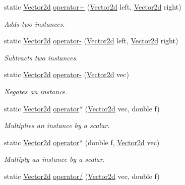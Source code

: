 \begin{DoxyCompactItemize}
static \hyperlink{struct_open_t_k_1_1_vector2d}{Vector2d} \hyperlink{struct_open_t_k_1_1_vector2d_a251b196f64b1ea5ad9b68f3995100faf}{operator+} (\hyperlink{struct_open_t_k_1_1_vector2d}{Vector2d} left, \hyperlink{struct_open_t_k_1_1_vector2d}{Vector2d} right)
\begin{DoxyCompactList}\small\item\em Adds two instances. \end{DoxyCompactList}\item 
static \hyperlink{struct_open_t_k_1_1_vector2d}{Vector2d} \hyperlink{struct_open_t_k_1_1_vector2d_ad046f955a83215dafa09a8ad34f345d0}{operator-\/} (\hyperlink{struct_open_t_k_1_1_vector2d}{Vector2d} left, \hyperlink{struct_open_t_k_1_1_vector2d}{Vector2d} right)
\begin{DoxyCompactList}\small\item\em Subtracts two instances. \end{DoxyCompactList}\item 
static \hyperlink{struct_open_t_k_1_1_vector2d}{Vector2d} \hyperlink{struct_open_t_k_1_1_vector2d_ae6a1ed03e3e0f7d2c0e4d82912fe989a}{operator-\/} (\hyperlink{struct_open_t_k_1_1_vector2d}{Vector2d} vec)
\begin{DoxyCompactList}\small\item\em Negates an instance. \end{DoxyCompactList}\item 
static \hyperlink{struct_open_t_k_1_1_vector2d}{Vector2d} \hyperlink{struct_open_t_k_1_1_vector2d_a20dbfda77980897863a01ed1232e0907}{operator$\ast$} (\hyperlink{struct_open_t_k_1_1_vector2d}{Vector2d} vec, double f)
\begin{DoxyCompactList}\small\item\em Multiplies an instance by a scalar. \end{DoxyCompactList}\item 
static \hyperlink{struct_open_t_k_1_1_vector2d}{Vector2d} \hyperlink{struct_open_t_k_1_1_vector2d_a7fbb650025220146c1536644d4972044}{operator$\ast$} (double f, \hyperlink{struct_open_t_k_1_1_vector2d}{Vector2d} vec)
\begin{DoxyCompactList}\small\item\em Multiply an instance by a scalar. \end{DoxyCompactList}\item 
static \hyperlink{struct_open_t_k_1_1_vector2d}{Vector2d} \hyperlink{struct_open_t_k_1_1_vector2d_aaa4d82b39bee4eab099d5787296770b1}{operator/} (\hyperlink{struct_open_t_k_1_1_vector2d}{Vector2d} vec, double f)

\end{DoxyCompactItemize}
